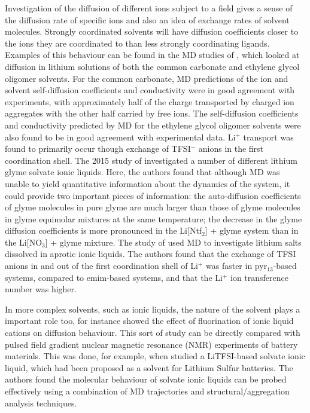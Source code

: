 \documentclass[../main.tex]{subfiles}
\begin{document}
Investigation of the diffusion of different ions subject to a field gives a sense of the diffusion rate of specific ions and also an idea of exchange rates of solvent molecules. Strongly coordinated solvents will have diffusion coefficients closer to the ions they are coordinated to than less strongly coordinating ligands.\cite{shimizu_structural_2015, lesch_influence_2015, borodin_litfsi_2006,borodin_li_2006,borodin_li_2007} Examples of this behaviour can be found in the MD studies of \citeauthor{borodin_li_2006}, which looked at diffusion in lithium solutions of both the common carbonate\cite{borodin_litfsi_2006} and ethylene glycol oligomer solvents.\cite{borodin_li_2006} For the common carbonate, MD predictions of the ion and solvent self-diffusion coefficients and conductivity were in good agreement with experiments, with approximately half of the charge transported by charged ion aggregates with the other half carried by free ions.\cite{borodin_litfsi_2006} The self-diffusion coefficients and conductivity predicted by MD for the ethylene glycol oligomer solvents were also found to be in good agreement with experimental data. Li$^+$ transport was found to primarily occur though exchange of TFSI$^-$ anions in the first coordination shell.\cite{borodin_li_2006} The 2015 study of \citeauthor{shimizu_structural_2015} investigated a number of different lithium glyme solvate ionic liquids.\cite{shimizu_structural_2015} Here, the authors found that although MD was unable to yield quantitative information about the dynamics of the system, it could provide two important pieces of information: the auto-diffusion coefficients of glyme molecules in pure glyme are much larger than those of glyme molecules in glyme equimolar mixtures at the same temperature; the decrease in the glyme diffusion coefficients is more pronounced in the Li[Ntf$_2$] + glyme system than in the Li[NO$_3$] + glyme mixture.\cite{shimizu_structural_2015} The study of \citeauthor{lesch_influence_2015} used MD to investigate lithium salts dissolved in aprotic ionic liquids.\cite{lesch_influence_2015} The authors found that the exchange of TFSI anions in and out of the first coordination shell of Li$^+$ was faster in pyr$_{13}$-based systems, compared to emim-based systems, and that the Li$^+$ ion transference number was higher. \cite{lesch_influence_2015}

In more complex solvents, such as ionic liquids, the nature of the solvent plays a important role too, for instance \citeauthor{borodin_li_2007} showed the effect of fluorination of ionic liquid cations on diffusion behaviour.\cite{borodin_li_2007} This sort of study can be directly compared with pulsed field gradient nuclear magnetic resonance (NMR) experiments of battery materials. This was done, for example, when \citeauthor{shimizu_structural_2015} studied a LiTFSI-based solvate ionic liquid, which had been proposed as a solvent for Lithium Sulfur batteries.\cite{shimizu_structural_2015} The authors found the molecular behaviour of solvate ionic liquids can be probed effectively using a combination of MD trajectories and structural/aggregation analysis techniques.
\end{document}
